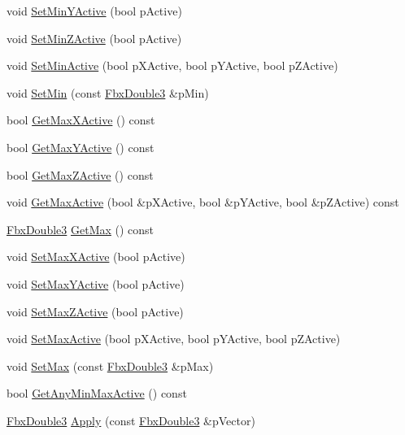 \begin{DoxyCompactItemize}
\item 
void \hyperlink{class_fbx_limits_a0c318feddc17187ef7011f254068db8f}{Set\+Min\+Y\+Active} (bool p\+Active)
\item 
void \hyperlink{class_fbx_limits_a4d082ec302ffcac6d5a83a5c01ec9817}{Set\+Min\+Z\+Active} (bool p\+Active)
\item 
void \hyperlink{class_fbx_limits_a51a68932b8f0c1a97244088d4840e8ea}{Set\+Min\+Active} (bool p\+X\+Active, bool p\+Y\+Active, bool p\+Z\+Active)
\item 
void \hyperlink{class_fbx_limits_ad380f8aaba424943aa46a1f8d642e0a2}{Set\+Min} (const \hyperlink{fbxtypes_8h_ae0a96f14cde566774c7553aa7523b7a7}{Fbx\+Double3} \&p\+Min)
\item 
bool \hyperlink{class_fbx_limits_a1c06d0786e11e5bded1464359b32ef86}{Get\+Max\+X\+Active} () const
\item 
bool \hyperlink{class_fbx_limits_a9c35de6b7cf9fbc6eb72b6cc37211cd7}{Get\+Max\+Y\+Active} () const
\item 
bool \hyperlink{class_fbx_limits_a80245178e61a5c9145685ea619731b3c}{Get\+Max\+Z\+Active} () const
\item 
void \hyperlink{class_fbx_limits_abf8ef22b8369f55d59c5066f7a1e64a4}{Get\+Max\+Active} (bool \&p\+X\+Active, bool \&p\+Y\+Active, bool \&p\+Z\+Active) const
\item 
\hyperlink{fbxtypes_8h_ae0a96f14cde566774c7553aa7523b7a7}{Fbx\+Double3} \hyperlink{class_fbx_limits_a398d831c3b798b29ccf33e29a72d6962}{Get\+Max} () const
\item 
void \hyperlink{class_fbx_limits_a3cd2e8d3fb746b1872a2a94c382ab410}{Set\+Max\+X\+Active} (bool p\+Active)
\item 
void \hyperlink{class_fbx_limits_a6b8a5aa910a87cc805a00a70c0df2439}{Set\+Max\+Y\+Active} (bool p\+Active)
\item 
void \hyperlink{class_fbx_limits_a83dfa28859c1e26985e2ec963fe32a28}{Set\+Max\+Z\+Active} (bool p\+Active)
\item 
void \hyperlink{class_fbx_limits_adb51ef228a31741ab0ad20a5a83d4ab6}{Set\+Max\+Active} (bool p\+X\+Active, bool p\+Y\+Active, bool p\+Z\+Active)
\item 
void \hyperlink{class_fbx_limits_ab3af1af72a0c006c836a9684cc66af27}{Set\+Max} (const \hyperlink{fbxtypes_8h_ae0a96f14cde566774c7553aa7523b7a7}{Fbx\+Double3} \&p\+Max)
\item 
bool \hyperlink{class_fbx_limits_a8212a912af1692135239e402a38cd47c}{Get\+Any\+Min\+Max\+Active} () const
\item 
\hyperlink{fbxtypes_8h_ae0a96f14cde566774c7553aa7523b7a7}{Fbx\+Double3} \hyperlink{class_fbx_limits_a6b64655b62833ad966cf868b4781bf86}{Apply} (const \hyperlink{fbxtypes_8h_ae0a96f14cde566774c7553aa7523b7a7}{Fbx\+Double3} \&p\+Vector)
\end{DoxyCompactItemize}


